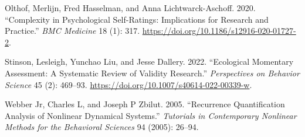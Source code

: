 \documentclass[
  letterpaper,
  DIV=11,
  numbers=noendperiod]{scrartcl}
\newlength{\cslhangindent}
\newlength{\cslentryspacingunit} %
\newenvironment{CSLReferences}[2] %
 {%
  \setlength{\parindent}{0pt}
  \ifodd #1
  \let\oldpar\par
  \def\par{\hangindent=\cslhangindent\oldpar}
  \fi
  \setlength{\parskip}{#2\cslentryspacingunit}
 }%
 {}
\begin{document}
\begin{CSLReferences}{1}{0}
\leavevmode{}%
Olthof, Merlijn, Fred Hasselman, and Anna Lichtwarck-Aschoff. 2020.
{``Complexity in Psychological Self-Ratings: Implications for Research
and Practice.''} \emph{BMC Medicine} 18 (1): 317.
\url{https://doi.org/10.1186/s12916-020-01727-2}.

\leavevmode{}%
Stinson, Lesleigh, Yunchao Liu, and Jesse Dallery. 2022. {``Ecological
{Momentary Assessment}: {A Systematic Review} of {Validity Research}.''}
\emph{Perspectives on Behavior Science} 45 (2): 469--93.
\url{https://doi.org/10.1007/s40614-022-00339-w}.

\leavevmode{}%
Webber Jr, Charles L, and Joseph P Zbilut. 2005. {``Recurrence
Quantification Analysis of Nonlinear Dynamical Systems.''}
\emph{Tutorials in Contemporary Nonlinear Methods for the Behavioral
Sciences} 94 (2005): 26--94.

\end{CSLReferences}
\end{document}
